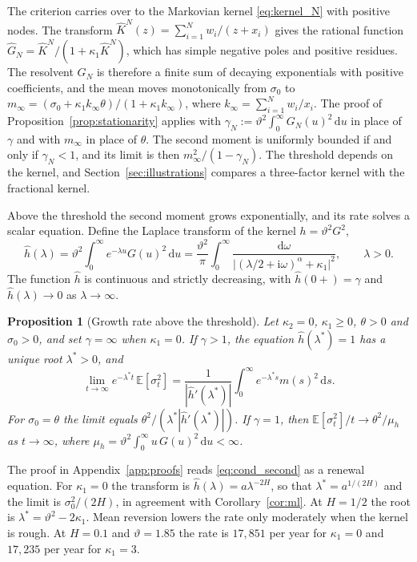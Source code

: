 \documentclass{rQUF2e}
\theoremstyle{plain}
\newtheorem{proposition}[theorem]{Proposition}
\theoremstyle{definition}
\theoremstyle{remark}
\newcommand{\D}{\mathrm{d}}
\newcommand{\E}{\mathbb{E}}
\begin{document}
The criterion carries over to the Markovian kernel \eqref{eq:kernel_N} with positive nodes. The transform $\widehat K^N(z)=\sum_{i=1}^Nw_i/(z+x_i)$ gives the rational function $\widehat G_N=\widehat K^N/(1+\kappa_1\widehat K^N)$, which has simple negative poles and positive residues. The resolvent $G_N$ is therefore a finite sum of decaying exponentials with positive coefficients, and the mean moves monotonically from $\sigma_0$ to $m_\infty=(\sigma_0+\kappa_1k_\infty\theta)/(1+\kappa_1k_\infty)$, where $k_\infty=\sum_{i=1}^Nw_i/x_i$. The proof of Proposition~\ref{prop:stationarity} applies with $\gamma_N:=\vartheta^2\int_0^\infty G_N(u)^2\,\D u$ in place of $\gamma$ and with $m_\infty$ in place of $\theta$. The second moment is uniformly bounded if and only if $\gamma_N<1$, and its limit is then $m_\infty^2/(1-\gamma_N)$. The threshold depends on the kernel, and Section~\ref{sec:illustrations} compares a three-factor kernel with the fractional kernel.

Above the threshold the second moment grows exponentially, and its rate solves a scalar equation. Define the Laplace transform of the kernel $h=\vartheta^2G^2$,
\begin{equation}\label{eq:h_hat}
\widehat h(\lambda)=\vartheta^2\int_0^\infty e^{-\lambda u}G(u)^2\,\D u
=\frac{\vartheta^2}{\pi}\int_0^\infty\frac{\D\omega}{\big|(\lambda/2+\mathrm{i}\omega)^\alpha+\kappa_1\big|^2},\qquad\lambda>0 .
\end{equation}
The function $\widehat h$ is continuous and strictly decreasing, with $\widehat h(0+)=\gamma$ and $\widehat h(\lambda)\to0$ as $\lambda\to\infty$.

\begin{proposition}[Growth rate above the threshold]\label{prop:growth}
Let $\kappa_2=0$, $\kappa_1\ge0$, $\theta>0$ and $\sigma_0>0$, and set $\gamma=\infty$ when $\kappa_1=0$. If $\gamma>1$, the equation $\widehat h(\lambda^*)=1$ has a unique root $\lambda^*>0$, and
\begin{equation}\label{eq:growth}
\lim_{t\to\infty}e^{-\lambda^*t}\,\E[\sigma_t^2]=\frac{1}{|\widehat h'(\lambda^*)|}\int_0^\infty e^{-\lambda^*s}m(s)^2\,\D s .
\end{equation}
For $\sigma_0=\theta$ the limit equals $\theta^2/(\lambda^*|\widehat h'(\lambda^*)|)$. If $\gamma=1$, then $\E[\sigma_t^2]/t\to\theta^2/\mu_h$ as $t\to\infty$, where $\mu_h=\vartheta^2\int_0^\infty u\,G(u)^2\,\D u<\infty$.
\end{proposition}

The proof in Appendix~\ref{app:proofs} reads \eqref{eq:cond_second} as a renewal equation. For $\kappa_1=0$ the transform is $\widehat h(\lambda)=a\lambda^{-2H}$, so that $\lambda^*=a^{1/(2H)}$ and the limit is $\sigma_0^2/(2H)$, in agreement with Corollary~\ref{cor:ml}. At $H=1/2$ the root is $\lambda^*=\vartheta^2-2\kappa_1$. Mean reversion lowers the rate only moderately when the kernel is rough. At $H=0.1$ and $\vartheta=1.85$ the rate is $17{,}851$ per year for $\kappa_1=0$ and $17{,}235$ per year for $\kappa_1=3$.
\end{document}
